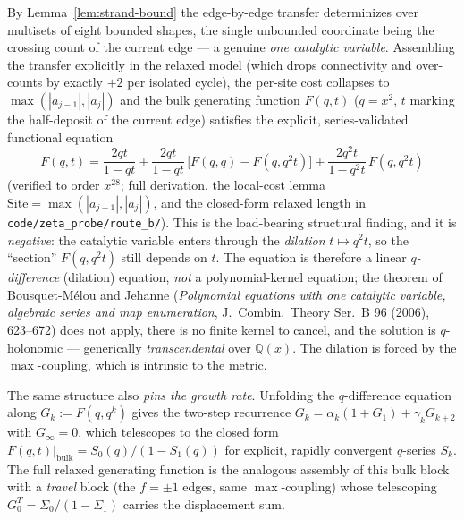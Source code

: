 \documentclass[11pt,a4paper]{article}
\theoremstyle{remark}
\theoremstyle{plain}
\begin{document}
By Lemma~\ref{lem:strand-bound} the edge-by-edge transfer determinizes
over multisets of eight bounded shapes, the single unbounded coordinate
being the crossing count of the current edge --- a genuine \emph{one
catalytic variable}.  Assembling the transfer explicitly in the relaxed
model (which drops connectivity and over-counts by exactly $+2$ per
isolated cycle), the per-site cost collapses to
$\max(|a_{j-1}|, |a_j|)$ and the bulk generating function $F(q, t)$
($q = x^2$, $t$ marking the half-deposit of the current edge) satisfies
the explicit, series-validated functional equation
\[
F(q, t) = \frac{2qt}{1 - qt}
        + \frac{2qt}{1 - qt}\,\bigl[F(q, q) - F(q, q^2 t)\bigr]
        + \frac{2q^2 t}{1 - q^2 t}\, F(q, q^2 t)
\]
(verified to order $x^{28}$; full derivation, the local-cost lemma
$\mathrm{Site} = \max(|a_{j-1}|, |a_j|)$, and the closed-form relaxed
length in \texttt{code/zeta\_probe/route\_b/}).  This is the load-bearing
structural finding, and it is \emph{negative}: the catalytic variable
enters through the \emph{dilation} $t \mapsto q^2 t$, so the ``section''
$F(q, q^2 t)$ still depends on $t$.  The equation is therefore a linear
\emph{$q$-difference} (dilation) equation, \emph{not} a polynomial-kernel
equation; the theorem of Bousquet-M\'elou and Jehanne (\emph{Polynomial
equations with one catalytic variable, algebraic series and map
enumeration}, J.~Combin.\ Theory Ser.~B 96 (2006), 623--672) does not
apply, there is no finite kernel to cancel, and the solution is
$q$-holonomic --- generically \emph{transcendental} over $\mathbb{Q}(x)$.
The dilation is forced by the $\max$-coupling, which is intrinsic to the
metric.

The same structure also \emph{pins the growth rate}.  Unfolding the
$q$-difference equation along $G_k := F(q, q^k)$ gives the two-step
recurrence $G_k = \alpha_k(1 + G_1) + \gamma_k G_{k+2}$ with
$G_\infty = 0$, which telescopes to the closed form
$F(q, t)\big|_{\text{bulk}} = S_0(q)/(1 - S_1(q))$ for explicit, rapidly
convergent $q$-series $S_k$.  The full relaxed generating function is the
analogous assembly of this bulk block with a \emph{travel} block (the
$f = \pm 1$ edges, same $\max$-coupling) whose telescoping
$G^T_0 = \Sigma_0/(1 - \Sigma_1)$ carries the displacement sum.
\end{document}
